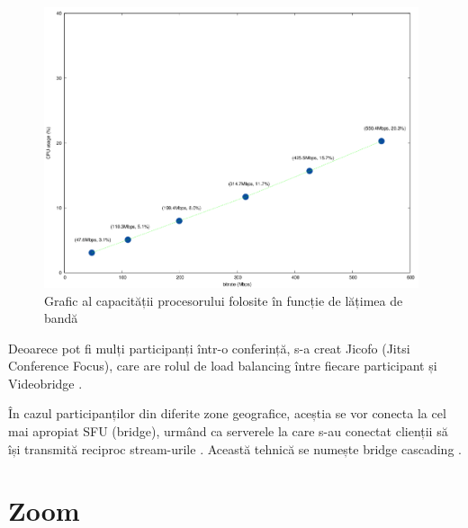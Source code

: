 \begin{figure}[H]
    \centering
    \includegraphics[width=11cm,trim={0 0 0 3cm}, clip]{figures/jitsi_videobridge_cpu.png}
    \caption{Grafic al capacității procesorului folosite în funcție de lățimea de bandă \cite{JitsiVideobridge}}
    \label{JitsiVideobridgeCPU}
\end{figure}
\indent \par Deoarece pot fi mulți participanți într-o conferință, s-a creat Jicofo (Jitsi Conference Focus), care are rolul de load balancing între fiecare participant și Videobridge \cite{JitsiArchitecture}.
\indent \par În cazul participanților din diferite zone geografice, aceștia se vor conecta la cel mai apropiat SFU (bridge), urmând ca serverele la care s-au conectat clienții să își transmită reciproc stream-urile \cite{JitsiBridgeCascading}. Această tehnică se numește bridge cascading \cite{JitsiBridgeCascading}.

\section{Zoom}
\label{chap:ch4sec3}

